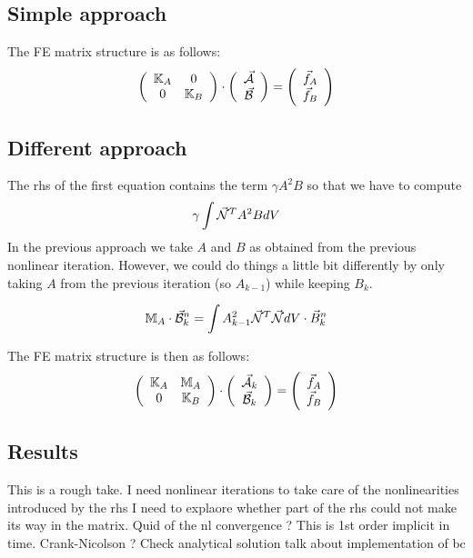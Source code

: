 \subsection*{Simple approach} The FE matrix structure is as follows:
\[
\left(
\begin{array}{cc}
{\mathbb{K}}_A & 0 \\
0 & {\mathbb{K}}_B
\end{array}
\right)
\cdot
\left(
\begin{array}{c}
\vec{\cal A}\\
\vec{\cal B}
\end{array}
\right)
=
\left(
\begin{array}{c}
\vec{f}_A\\
\vec{f}_B
\end{array}
\right)
\]


\subsection*{Different approach} The rhs of the first equation contains the term $\gamma A^2B$
so that we have to compute
\[
\gamma \int \vec{\cal N}^T A^2 B dV
\]
In the previous approach we take $A$ and $B$ as obtained from the previous nonlinear iteration. 
However, we could do things a little bit differently by only taking $A$ from the previous iteration (so $A_{k-1}$)
while keeping $B_{k}$.

\[
{\mathbb{M}}_A \cdot \vec{\cal B}^n_k =  \int A_{k-1}^2 \vec{{\mathcal{N}}}^T \vec{{\mathcal{N}}} dV  \cdot \vec{B}_k^n
\]


The FE matrix structure is then as follows:
\[
\left(
\begin{array}{cc}
{\mathbb{K}}_A & {\mathbb{M}}_A \\
0 & {\mathbb{K}}_B
\end{array}
\right)
\cdot
\left(
\begin{array}{c}
\vec{\cal A}_k\\
\vec{\cal B}_k
\end{array}
\right)
=
\left(
\begin{array}{c}
\vec{f}_A\\
\vec{f}_B
\end{array}
\right)
\]


\subsection*{Results} 
This is a rough take.
I need nonlinear iterations to take care of the nonlinearities introduced by the rhs
I need to explaore whether part of the rhs could not make its way in the matrix. 
Quid of the nl convergence ?
This is 1st order implicit in time. Crank-Nicolson ?
Check analytical solution 
talk about implementation of bc

